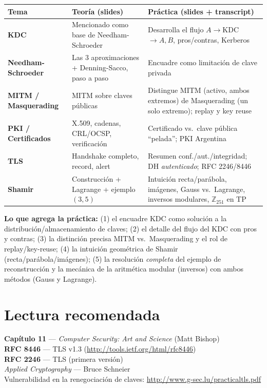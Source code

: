 \documentclass[11pt,a4paper]{article}
\begin{document}
\begin{center}
\renewcommand{\arraystretch}{1.3}
\begin{tabular}{>{\bfseries}p{3.6cm} p{4.7cm} p{4.7cm}}
\toprule
Tema & Teoría (slides) & Práctica (slides + transcript) \\
\midrule
KDC & Mencionado como base de Needham-Schroeder & \textcolor{practGreen}{Desarrolla el flujo $A\to$KDC$\to A,B$, pros/contras, Kerberos}\\
Needham-Schroeder & Las 3 aproximaciones + Denning-Sacco, paso a paso & Encuadre como limitación de clave privada\\
MITM / Masquerading & MITM sobre claves públicas & \textcolor{practGreen}{Distingue MITM (activo, ambos extremos) de Masquerading (un solo extremo); replay y key reuse}\\
PKI / Certificados & X.509, cadenas, CRL/OCSP, verificación & \textcolor{practGreen}{Certificado vs.\ clave pública ``pelada''; PKI Argentina}\\
TLS & Handshake completo, record, alert & \textcolor{practGreen}{Resumen conf./aut./integridad; DH \emph{autenticado}; RFC 2246/8446}\\
Shamir & Construcción + Lagrange + ejemplo $(3,5)$ & \textcolor{practGreen}{Intuición recta/parábola, imágenes, Gauss vs.\ Lagrange, inversos modulares, $\mathbb{Z}_{251}$ en TP}\\
\bottomrule
\end{tabular}
\end{center}

\noindent\textbf{Lo que agrega la práctica:} (1) el encuadre KDC como solución a la
distribución/almacenamiento de claves; (2) el detalle del flujo del KDC con pros y contras;
(3) la distinción precisa MITM vs.\ Masquerading y el rol de replay/key-reuse; (4) la
intuición geométrica de Shamir (recta/parábola/imágenes); (5) la resolución \emph{completa}
del ejemplo de reconstrucción y la mecánica de la aritmética modular (inversos) con ambos
métodos (Gauss y Lagrange).

\section*{Lectura recomendada}
\begin{center}
\begin{tcolorbox}[enhanced,colback=itbaBlue!20,colframe=itbaCyanDark,boxrule=1pt,
  arc=3pt,width=0.9\textwidth,halign=center]
\large\textbf{Capítulo 11} — \emph{Computer Security: Art and Science} (Matt Bishop)\\[6pt]
\normalsize \textbf{RFC 8446} — TLS v1.3 \quad(\url{http://tools.ietf.org/html/rfc8446})\\[3pt]
\textbf{RFC 2246} — TLS (primera versión)\\[3pt]
\emph{Applied Cryptography} — Bruce Schneier\\[3pt]
Vulnerabilidad en la renegociación de claves: \url{http://www.g-sec.lu/practicaltls.pdf}
\end{tcolorbox}
\end{center}
\end{document}
